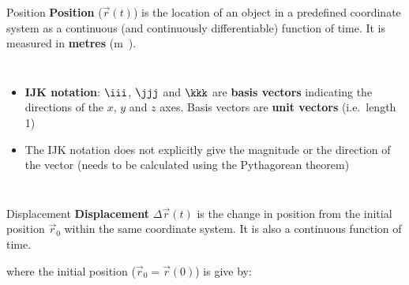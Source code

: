 \documentclass[12pt,compress,aspectratio=169,dvipsnames]{beamer}
\begin{document}
\begin{frame}{Position}
  \textbf{Position} ($\vec r(t)$) is the location of an object in a predefined
  coordinate system as a continuous (and continuously differentiable) function
  of time. It is measured in \textbf{metres} (\si\metre).
  \begin{columns}

    \begin{itemize}
    \item\vspace{-.1in}\textbf{IJK notation}: $\iii$, $\jjj$ and $\kkk$ are
      \textbf{basis vectors} indicating the directions of the $x$, $y$ and $z$
      axes. Basis vectors are \textbf{unit vectors} (i.e.\ length 1)
    \item The IJK notation does not explicitly give the magnitude or the
      direction of the vector (needs to be calculated using the Pythagorean
      theorem)
    \end{itemize}

  \end{columns}
\end{frame}



\begin{frame}{Displacement}
  \textbf{Displacement} $\Delta\vec r(t)$ is the change in position from the
  initial position $\vec r_0$ within the same coordinate system. It is also a
  continuous function of time.


  where the initial position ($\vec r_0=\vec r(0)$) is give by:

  
\end{frame}
\end{document}
